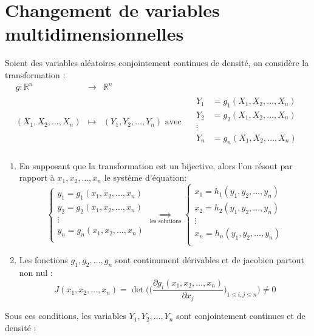 \documentclass{article}
\begin{document}
	\section*{Changement de variables multidimensionnelles}
		Soient des variables aléatoires conjointement continues de densité, on considère la transformation :
	\begin{eqnarray*}
		g:\mathbb{R}^n &\longrightarrow& \mathbb{R}^n\\
		(X_1,X_2,\ldots,X_n)&\longmapsto&(Y_1,Y_2,\ldots,Y_n)\text{ avec }\quad
		\begin{aligned}
		Y_1&=g_1(X_1,X_2,\ldots,X_n)\\
		Y_2&=g_2(X_1,X_2,\ldots,X_n)\\
		\vdots&\\
		Y_n&=g_n(X_1,X_2,\ldots,X_n)\\
		\end{aligned}
	\end{eqnarray*}
	\begin{enumerate}
		\item En supposant que la transformation est un bijective, alors l'on résout par rapport à \(x_1,x_2,\ldots,x_n\) le système d'équation:
		\begin{equation*}
		\begin{cases}
		y_1=g_1(x_1,x_2,\ldots,x_n)\\
		y_2=g_2(x_1,x_2,\ldots,x_n)\\
		\vdots\\
		y_n=g_n(x_1,x_2,\ldots,x_n)\\
		\end{cases}\underset{\text{les solutions}}{\implies}
		\begin{cases}
		x_1=h_1(y_1,y_2,\ldots,y_n)\\
		x_2=h_2(y_1,y_2,\ldots,y_n)\\
		\vdots\\
		x_n=h_n(y_1,y_2,\ldots,y_n)\\
		\end{cases}
		\end{equation*}
		\item Les fonctions \(g_1,g_2,\ldots,g_n\) sont continument dérivables et de jacobien partout non nul :
		\begin{equation*}
		J(x_1,x_2,\ldots,x_n)=\det\Bigg(\bigg(\frac{\partial g_i(x_1,x_2,\ldots,x_n)}{\partial x_j}\bigg)_{1\leq i,j\leq n}\Bigg)\neq 0
		\end{equation*}
	\end{enumerate}
	Sous ces conditions, les variables \(Y_1,Y_2,\ldots,Y_n\) sont conjointement continues et de densité :
\end{document}

